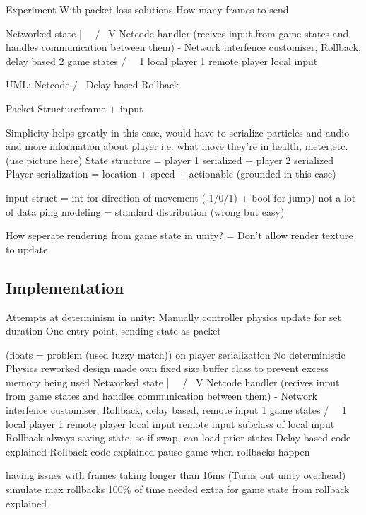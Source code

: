 \documentclass{entcs}
\begin{document}
Experiment With packet loss solutions
How many frames to send

Networked state
 |                  \
\ /                  \
 V                    Netcode handler (recives input from game states and handles communication between them) - Network interfence customiser, Rollback, delay based
2 game states              
/             \                        \
1 local player   1 remote player        local input

UML:
Netcode
/               \
Delay based      Rollback

Packet Structure:frame + input

Simplicity helps greatly in this case, would have to serialize particles and audio and more information about player i.e. what move they're in health, meter,etc. (use picture here)
State structure = player 1 serialized + player 2 serialized
Player serialization = location + speed + actionable (grounded in this case)

input struct = int for direction of movement (-1/0/1) + bool for jump) not a lot of data
 ping modeling = standard distribution (wrong but easy)

How seperate rendering from game state in unity? = Don't allow render texture to update

\subsection{Implementation}

Attempts at determinism in unity:
Manually controller physics update for set duration 
One entry point, sending state as packet

(floats = problem (used fuzzy match)) on player serialization
No deterministic Physics
reworked design
made own fixed size buffer class to prevent excess memory being used
Networked state
 |                  \
\ /                  \
 V                    Netcode handler (recives input from game states and handles communication between them) - Network interfence customiser, Rollback, delay based, remote input
1 game states              
/             \                        \
1 local player   1 remote player        local input
 remote input subclass of local input
Rollback always saving state, so if swap, can load prior states
Delay based code explained
Rollback code explained
pause game when rollbacks happen

having issues with frames taking longer than 16ms (Turns out unity overhead)
simulate max rollbacks 100\% of time
needed extra for game state from rollback explained
\end{document}
